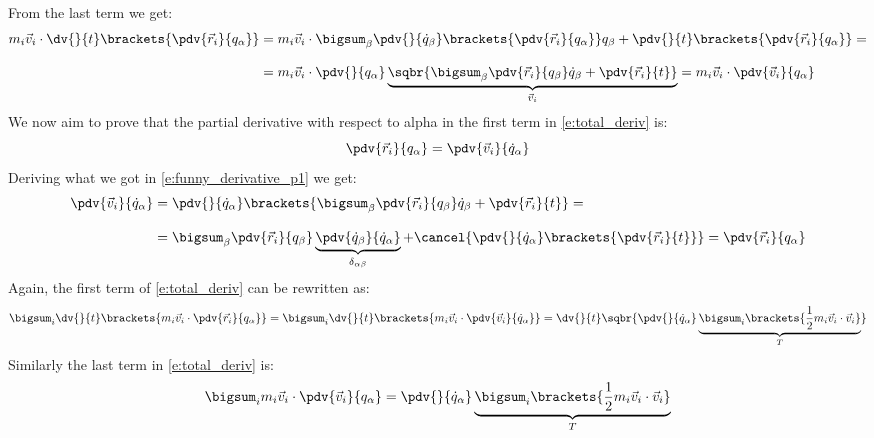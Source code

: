 From the last term we get:
\begin{equation} \label{e:funny_derivative_p1}
    \begin{split}
      m_i\vec{v}_i \cdot \dv{}{t}\brackets{\pdv{ \vec{r}_i}{ q_{\alpha}}} &= m_i\vec{v}_i \cdot \bigsum_{\beta} \pdv{}{ \dot{q}_{\beta} }\brackets{\pdv{ \vec{r}_i}{ q_{\alpha}}} q_{\beta} + \pdv{}{ t}\brackets{\pdv{ \vec{r}_i}{ q_{\alpha}}} = \\[8pt]
      &= m_i\vec{v}_i \cdot \pdv{}{ q_{\alpha} }\underbrace{\sqbr{\bigsum_{\beta} \pdv{ \vec{r}_i}{ q_{\beta}} \dot{q}_{\beta} + \pdv{ \vec{r}_i}{ t}}}_{\vec{v}_i} = m_i\vec{v}_i \cdot \pdv{ \vec{v}_i}{ q_{\alpha}}
    \end{split}
\end{equation}
We now aim to prove that the partial derivative with respect to alpha in the first term in \eqref{e:total_deriv} is:
\begin{equation}
    \pdv{ \vec{r}_i}{ q_{\alpha}} = \pdv{ \vec{v}_i}{ \dot{q}_{\alpha}}
\end{equation}
Deriving what we got in \eqref{e:funny_derivative_p1} we get:
\begin{equation}
    \begin{split}
      \pdv{ \vec{v}_i}{ \dot{q}_{\alpha}} &= \pdv{ }{ \dot{q}_{\alpha}} \brackets{\bigsum_{\beta}\pdv{ \vec{r}_i}{ q_{\beta}} \dot{q}_{\beta} + \pdv{ \vec{r}_i}{ t}} = \\[8pt]
      &= \bigsum_{\beta}\pdv{ \vec{r}_i}{ q_{\beta}} \underbrace{\pdv{ \dot{q}_{\beta}}{ \dot{q}_{\alpha}}}_{\delta_{\alpha \beta}}  + \cancel{\pdv{ }{ \dot{q}_{\alpha}}\brackets{\pdv{ \vec{r}_i}{ t}}} = \pdv{ \vec{r}_i}{ q_{\alpha}}
    \end{split}
\end{equation}
Again, the first term of \eqref{e:total_deriv} can be rewritten as:
\begin{equation}
    \bigsum_i \dv{}{t}\brackets{m_i\vec{v}_i \cdot \pdv{ \vec{r}_i}{ q_{\alpha}}} = \bigsum_i\dv{}{t}\brackets{m_i\vec{v}_i \cdot \pdv{ \vec{v}_i}{ \dot{q}_{\alpha}}} = \dv{}{t}\sqbr{\pdv{ }{ \dot{q}_{\alpha}} \underbrace{\bigsum_i \brackets{\dfrac{1}{2}m_i \vec{v}_i \cdot \vec{v}_i}}_{T}}
\end{equation}
Similarly the last term in \eqref{e:total_deriv} is:
\begin{equation}
    \bigsum_im_i\vec{v}_i \cdot \pdv{ \vec{v}_i}{ q_{\alpha}} = \pdv{ }{ \dot{q}_{\alpha}} \underbrace{\bigsum_i \brackets{\dfrac{1}{2}m_i \vec{v}_i \cdot \vec{v}_i}}_{T}
\end{equation}
